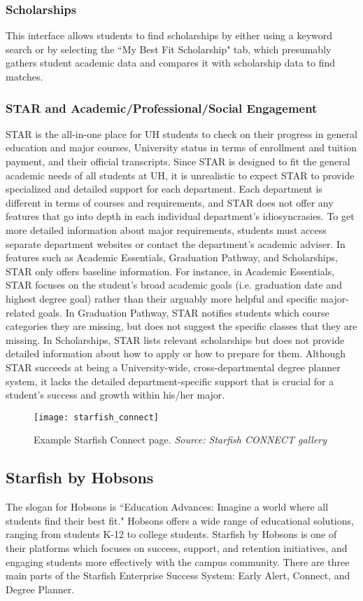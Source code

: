 \subsubsection{Scholarships}
This interface allows students to find scholarships by either using a keyword search or by selecting the ``My Best Fit Scholarship" tab, which presumably gathers student academic data and compares it with scholarship data to find matches.

\subsubsection{STAR and Academic/Professional/Social Engagement}
STAR is the all-in-one place for UH students to check on their progress in general education and major courses, University status in terms of enrollment and tuition payment, and their official transcripts. Since STAR is designed to fit the general academic needs of all students at UH, it is unrealistic to expect STAR to provide specialized and detailed support for each department. Each department is different in terms of courses and requirements, and STAR does not offer any features that go into depth in each individual department's idiosyncrasies. To get more detailed information about major requirements, students must access separate department websites or contact the department's academic adviser. 
In features such as Academic Essentials, Graduation Pathway, and Scholarships, STAR only offers baseline information. For instance, in Academic Essentials, STAR focuses on the student's broad academic goals (i.e. graduation date and highest degree goal) rather than their arguably more helpful and specific major-related goals. In Graduation Pathway, STAR notifies students which course categories they are missing, but does not suggest the specific classes that they are missing. In Scholarships, STAR lists relevant scholarships but does not provide detailed information about how to apply or how to prepare for them. Although STAR succeeds at being a University-wide, cross-departmental degree planner system, it lacks the detailed department-specific support that is crucial for a student's success and growth within his/her major. 

\begin{figure}[h]
\centering
\texttt{[image: starfish\_connect]}
\caption{Example Starfish Connect page. \textit{Source: Starfish CONNECT gallery}}
\end{figure}
\subsection{Starfish by Hobsons}
The slogan for Hobsons is ``Education Advances: Imagine a world where all students find their best fit." Hobsons offers a wide range of educational solutions, ranging from students K-12 to college students. Starfish by Hobsons is one of their platforms which focuses on success, support, and retention initiatives, and engaging students more effectively with the campus community. There are three main parts of the Starfish Enterprise Success System: Early Alert, Connect, and Degree Planner.
